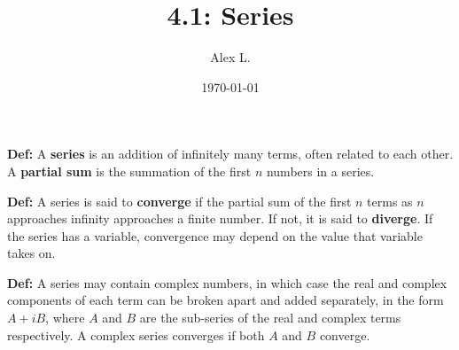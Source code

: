 \documentclass{article}
\title{4.1: Series}
\author{Alex L.}
\date{\today}
\begin{document}
\maketitle

\textbf{Def:} A \textbf{series} is an addition of infinitely many terms, often related to each other. A \textbf{partial sum} is the summation of the first $n$ numbers in a series.

\textbf{Def:} A series is said to \textbf{converge} if the partial sum of the first $n$ terms as $n$ approaches infinity approaches a finite number. If not, it is said to \textbf{diverge}. If the series has a variable, convergence may depend on the value that variable takes on.

\textbf{Def:} A series may contain complex numbers, in which case the real and complex components of each term can be broken apart and added separately, in the form $A+iB$, where $A$ and $B$ are the sub-series of the real and complex terms respectively. A complex series converges if both $A$ and $B$ converge. 
\end{document}
